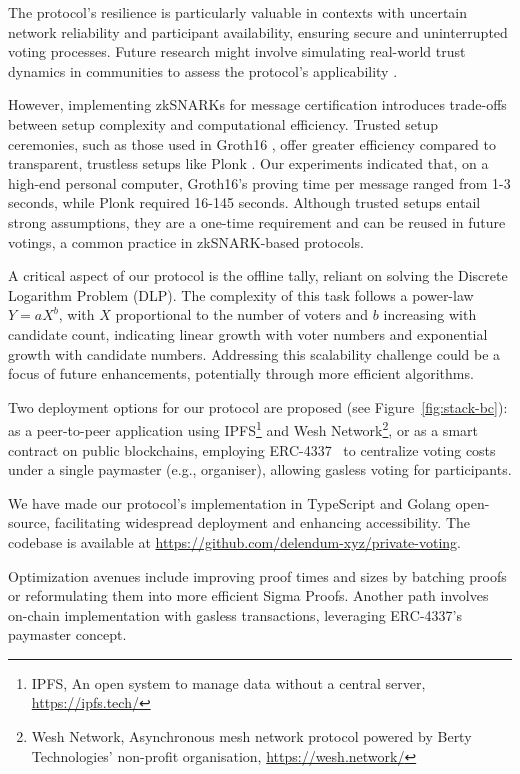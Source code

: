 \documentclass[runningheads]{llncs}
\begin{document}
The protocol's resilience is particularly valuable in contexts with uncertain network reliability and participant availability, ensuring secure and uninterrupted voting processes. Future research might involve simulating real-world trust dynamics in communities to assess the protocol's applicability \cite{healdMathematicalDescriptionTrust2019}.

However, implementing zkSNARKs for message certification introduces trade-offs between setup complexity and computational efficiency. Trusted setup ceremonies, such as those used in Groth16 \cite{grothSizePairingbasedNoninteractive2016}, offer greater efficiency compared to transparent, trustless setups like Plonk \cite{gabizonPlonkPermutationsLagrangebases2019a}. Our experiments indicated that, on a high-end personal computer, Groth16's proving time per message ranged from 1-3 seconds, while Plonk required 16-145 seconds. Although trusted setups entail strong assumptions, they are a one-time requirement and can be reused in future votings, a common practice in zkSNARK-based protocols.

A critical aspect of our protocol is the offline tally, reliant on solving the Discrete Logarithm Problem (DLP). The complexity of this task follows a power-law \( Y = aX^b \), with \( X \) proportional to the number of voters and \( b \) increasing with candidate count, indicating linear growth with voter numbers and exponential growth with candidate numbers. Addressing this scalability challenge could be a focus of future enhancements, potentially through more efficient algorithms.

Two deployment options for our protocol are proposed (see Figure~\ref{fig:stack-bc}): as a peer-to-peer application using IPFS\footnote{IPFS, An open system to manage data without a central server, \url{https://ipfs.tech/}} and Wesh Network\footnote{Wesh Network, Asynchronous mesh network protocol powered by Berty Technologies’ non-profit organisation, \url{https://wesh.network/}}, or as a smart contract on public blockchains, employing ERC-4337~\cite{ERC4337AccountAbstraction} to centralize voting costs under a single paymaster (e.g., organiser), allowing gasless voting for participants.

We have made our protocol's implementation in TypeScript and Golang open-source, facilitating widespread deployment and enhancing accessibility. The codebase is available at \url{https://github.com/delendum-xyz/private-voting}.

Optimization avenues include improving proof times and sizes by batching proofs or reformulating them into more efficient Sigma Proofs. Another path involves on-chain implementation with gasless transactions, leveraging ERC-4337's paymaster concept.
\end{document}
